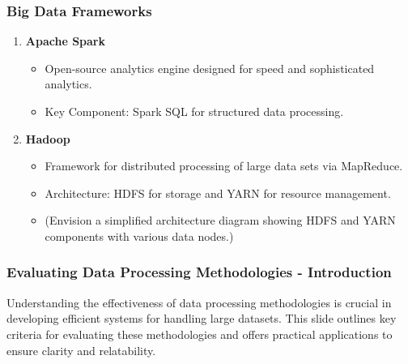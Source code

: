 \documentclass[aspectratio=169]{beamer}
\begin{document}
\begin{frame}[fragile]
    \frametitle{Big Data Frameworks}
    \begin{enumerate}
        \item \textbf{Apache Spark}
            \begin{itemize}
                \item Open-source analytics engine designed for speed and sophisticated analytics.
                \item Key Component: Spark SQL for structured data processing.
            \end{itemize}

        \item \textbf{Hadoop}
            \begin{itemize}
                \item Framework for distributed processing of large data sets via MapReduce.
                \item Architecture: HDFS for storage and YARN for resource management.
                \item (Envision a simplified architecture diagram showing HDFS and YARN components with various data nodes.)
            \end{itemize}
    \end{enumerate}
\end{frame}

\begin{frame}[fragile]
    \frametitle{Evaluating Data Processing Methodologies - Introduction}
    Understanding the effectiveness of data processing methodologies is crucial in developing efficient systems for handling large datasets. 
    This slide outlines key criteria for evaluating these methodologies and offers practical applications to ensure clarity and relatability.
\end{frame}
\end{document}
